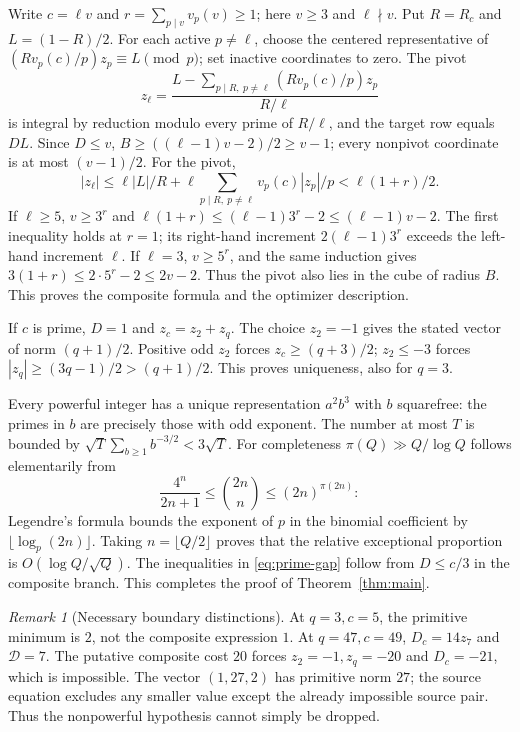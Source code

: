 \documentclass[11pt,a4paper]{article}
\theoremstyle{definition}\newtheorem{question}[theorem]{Question}
\theoremstyle{remark}\newtheorem{remark}[theorem]{Remark}
\newcommand{\Dgen}{\mathcal D}\newcommand{\mpr}{m_{\mathrm{prim}}}
\begin{document}
Write $c=\ell v$ and $r=\sum_{p\mid v}v_p(v)\ge1$; here
$v\ge3$ and $\ell\nmid v$. Put $R=R_c$ and $L=(1-R)/2$.
For each active $p\ne\ell$, choose the centered representative of
$(R v_p(c)/p)z_p\equiv L\pmod p$; set inactive coordinates to zero.
The pivot
\[
 z_\ell=\frac{L-\sum_{p\mid R,\ p\ne\ell}(Rv_p(c)/p)z_p}{R/\ell}
\]
is integral by reduction modulo every prime of $R/\ell$, and the
target row equals $DL$. Since $D\le v$,
$B\ge((\ell-1)v-2)/2\ge v-1$; every nonpivot coordinate is at most
$(v-1)/2$. For the pivot,
\[
 |z_\ell|\le\ell |L|/R+
 \ell\sum_{p\mid R,\ p\ne\ell}v_p(c)|z_p|/p
 <\ell(1+r)/2.
\]
If $\ell\ge5$, $v\ge3^r$ and
$\ell(1+r)\le(\ell-1)3^r-2\le(\ell-1)v-2$.
The first inequality holds at $r=1$; its right-hand increment
$2(\ell-1)3^r$ exceeds the left-hand increment $\ell$.
If $\ell=3$, $v\ge5^r$, and the same induction gives
$3(1+r)\le2\cdot5^r-2\le2v-2$.
Thus the pivot also lies in the cube of radius $B$.
This proves the composite formula and the optimizer description.

If $c$ is prime, $D=1$ and $z_c=z_2+z_q$.
The choice $z_2=-1$ gives the stated vector of norm $(q+1)/2$.
Positive odd $z_2$ forces $z_c\ge(q+3)/2$; $z_2\le-3$ forces
$|z_q|\ge(3q-1)/2>(q+1)/2$. This proves uniqueness, also for $q=3$.

Every powerful integer has a unique representation $a^2b^3$ with
$b$ squarefree: the primes in $b$ are precisely those with odd
exponent. The number at most $T$ is bounded by
$\sqrt T\sum_{b\ge1}b^{-3/2}<3\sqrt T$.
For completeness $\pi(Q)\gg Q/\log Q$ follows elementarily from
\[
 \frac{4^n}{2n+1}\le\binom{2n}{n}\le(2n)^{\pi(2n)}:
\]
Legendre's formula bounds the exponent of $p$ in the binomial
coefficient by $\lfloor\log_p(2n)\rfloor$.
Taking $n=\lfloor Q/2\rfloor$ proves that the relative exceptional
proportion is $O(\log Q/\sqrt Q)$. The inequalities in
\eqref{eq:prime-gap} follow from $D\le c/3$ in the composite branch.
This completes the proof of Theorem~\ref{thm:main}.

\begin{remark}[Necessary boundary distinctions]
At $q=3,c=5$, the primitive minimum is $2$, not the composite expression
$1$. At $q=47,c=49$, $D_c=14z_7$ and $\Dgen=7$.
The putative composite cost $20$ forces $z_2=-1,z_q=-20$ and
$D_c=-21$, which is impossible. The vector $(1,27,2)$ has primitive
norm $27$; the source equation excludes any smaller value except the
already impossible source pair. Thus the nonpowerful hypothesis
cannot simply be dropped.
\end{remark}
\end{document}
